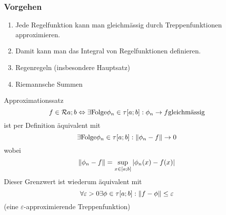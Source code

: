 \subsubsection{Vorgehen}
\begin{enumerate}
    \item Jede Regelfunktion kann man gleichmässig durch Treppenfunktionen approximieren.
    \item Damit kann man das Integral von Regelfunktionen definieren.
    \item Regenregeln (insbesondere Hauptsatz)
    \item Riemannsche Summen
\end{enumerate}
\begin{Sat}{Approximationssatz}
  \[f\in \mathcal{R}{a;b}\Leftrightarrow \exists \text{Folge} \phi_n\in \tau[a;b]:\phi_n\to f\text{gleichmässig}\]  
  ist per Definition äquivalent mit
  \[\exists \text{Folge}\phi_n\in \tau[a;b]: \left\| \phi_n-f \right\|\to 0\]
  wobei
  \[\left\| \phi_n-f \right\|=\sup_{x\in[a;b]}\left| \phi_n(x)-f(x) \right|\]
  Dieser Grenzwert ist wiederum äquivalent mit
  \[\forall\varepsilon>0 \exists\phi \in \tau[a;b]: \left\| f-\phi \right\|\leq \varepsilon\]
  (eine $\varepsilon$-approximierende Treppenfunktion)
\end{Sat}
